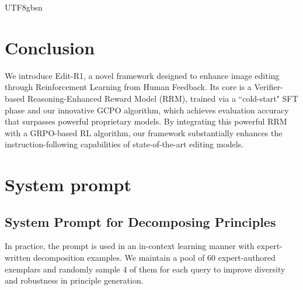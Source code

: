 \documentclass{llmxive}
\begin{document}
\begin{CJK*}{UTF8}{gbsn}
\section{Conclusion}

We introduce Edit-R1, a novel framework designed to enhance image editing through Reinforcement Learning from Human Feedback. Its core is a Verifier-based Reasoning-Enhanced Reward Model (RRM), trained via a ``cold-start" SFT phase and our innovative GCPO algorithm, which achieves evaluation accuracy that surpasses powerful proprietary models. By integrating this powerful RRM with a GRPO-based RL algorithm, our framework substantially enhances the instruction-following capabilities of state-of-the-art editing models. 










\appendix
\section{System prompt}
\subsection{System Prompt for Decomposing Principles}
\label{sec:appendix_prompt}
In practice, the prompt is used in an in-context learning manner with expert-written decomposition examples. We maintain a pool of 60 expert-authored exemplars and randomly sample 4 of them for each query to improve diversity and robustness in principle generation.



\end{CJK*}
\end{document}
